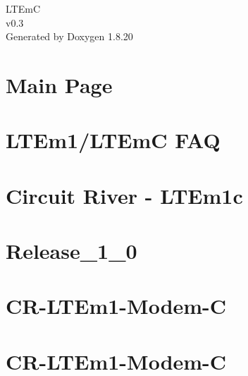 \let\mypdfximage\pdfximage\def\pdfximage{\immediate\mypdfximage}\documentclass[twoside]{book}
\newcommand{\+}{\discretionary{\mbox{\scriptsize$\hookleftarrow$}}{}{}}
\newcommand{\clearemptydoublepage}{%
  \newpage{\pagestyle{empty}\cleardoublepage}%
}
\begin{document}
\hypersetup{pageanchor=false,
             bookmarksnumbered=true,
             pdfencoding=unicode
            }
\begin{titlepage}
\vspace*{7cm}
\begin{center}%
{\Large L\+T\+EmC \\[1ex]\large v0.\+3 }\\
\vspace*{1cm}
{\large Generated by Doxygen 1.8.20}\\
\end{center}
\end{titlepage}
\clearemptydoublepage
{}
\tableofcontents
\clearemptydoublepage
{}
\hypersetup{pageanchor=true}

\chapter{Main Page}
\label{index}\hypertarget{index}{}
\chapter{L\+T\+Em1/\+L\+T\+EmC F\+AQ}
\label{md__l_t_em1-_f_a_q}

\chapter{Circuit River -\/ L\+T\+Em1c}
\label{md__r_e_a_d_m_e}

\chapter{Release\+\_\+1\+\_\+0}
\label{md__release_1_0}

\chapter{C\+R-\/\+L\+T\+Em1-\/\+Modem-\/C}
\label{md_tests__l_t_em_c-1-platform__r_e_a_d_m_e}

\chapter{C\+R-\/\+L\+T\+Em1-\/\+Modem-\/C}
\label{md_tests__l_t_em_c-2-components__r_e_a_d_m_e}

\end{document}
